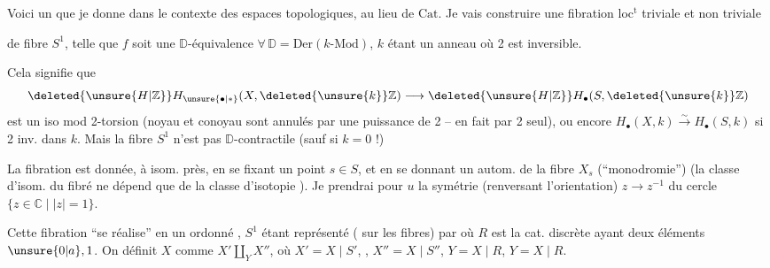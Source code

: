 
Voici un  que je donne  dans le contexte des espaces topologiques, au lieu de $\mathrm{Cat}$. Je vais construire une fibration loc$^{\mathrm t}$ triviale et non triviale

de fibre $S^1$, telle que $f$ soit une $\mathbb D$-équivalence $\forall\,\mathbb D=\mathrm{Der}(k\text{-}\mathrm{Mod})$, $k$ étant un anneau où 2 est inversible.


 Cela signifie que
\[\deleted{\unsure{H|\mathbb Z}}H_{\unsure{\bullet|*}}(X,\deleted{\unsure{k}}\mathbb Z)\longrightarrow\deleted{\unsure{H|\mathbb Z}}H_{\bullet}(S,\deleted{\unsure{k}}\mathbb Z)\]
est un iso mod 2-torsion (noyau et conoyau sont annulés par une puissance de 2 -- en fait par 2 seul), ou encore $H_{\bullet}(X,k)\xrightarrow{\sim}H_{\bullet}(S,k)$ si 2 inv. dans $k$. Mais la fibre $S^1$ n'est pas $\mathbb D$-contractile (sauf si $k=0$ !)

 La fibration est donnée, à isom.  près, en se fixant un point $s\in S$, et en se donnant  un autom.  de la fibre $X_s$  (``monodromie'') (la classe d'isom. du fibré ne dépend que de la classe d'isotopie ). Je prendrai pour $u$ la symétrie (renversant l'orientation) $z\longrightarrow z^{-1}$ du cercle  $\{z\in\mathbb C\mid |z|=1\}$.

Cette fibration ``se réalise''   en un ordonné , $S^1$ étant représenté (  sur les fibres) par
où $R$ est la cat. discrète ayant deux éléments $\unsure{0|a},1$. On définit $X$  comme $X'\amalg_Y X''$, où $X'=X\mid S'$, , $X''=X\mid S''$, $Y=X\mid R$,  $Y=X\mid R$.

